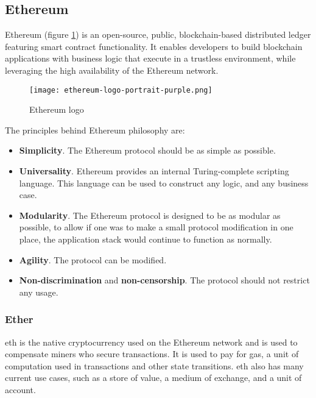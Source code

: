 \subsection{Ethereum}
        Ethereum\cite{ethereum} (figure \ref{fig:ethereum_logo}) is an open-source, public, blockchain-based distributed ledger featuring smart contract functionality. It enables developers to build blockchain applications with business logic that execute in a trustless environment, while leveraging the high availability of the Ethereum network. 
        \begin{figure}[h]
            \centering
            \texttt{[image: ethereum-logo-portrait-purple.png]}
            \caption{Ethereum logo}
            \label{fig:ethereum_logo}
        \end{figure}
        The principles behind Ethereum philosophy are\cite{ethereumWhitepaper}:
        \begin{itemize}
            \item \textbf{Simplicity}. The Ethereum protocol should be as simple as possible.
            \item \textbf{Universality}. Ethereum provides an internal Turing-complete scripting language. This language can be used to construct any logic, and any business case.
            \item \textbf{Modularity}. The Ethereum protocol is designed to be as modular as possible, to allow if one was to make a small protocol modification in one place, the application stack would continue to function as normally. 
            \item \textbf{Agility}. The protocol can be modified.
            \item \textbf{Non-discrimination} and \textbf{non-censorship}. The protocol should not restrict any usage.
        \end{itemize}
        
        \subsubsection{Ether}
            \acrfull{eth} is the native cryptocurrency used on the Ethereum network and is used to compensate miners who secure transactions. It is used to pay for gas, a unit of computation used in transactions and other state transitions.
            \acrlong{eth} also has many current use cases, such as a store of value, a medium of exchange, and a unit of account.
            
